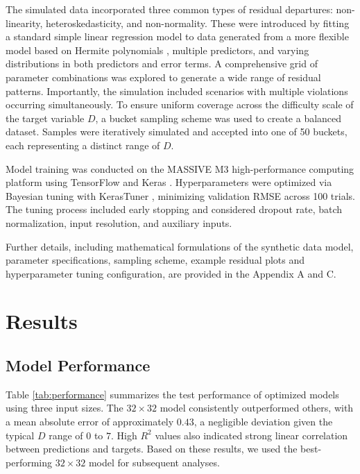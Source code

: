 \documentclass[]{interact}
\theoremstyle{plain}%
\theoremstyle{definition}
\theoremstyle{remark}
\begin{document}
The simulated data incorporated three common types of residual
departures: non-linearity, heteroskedasticity, and non-normality. These
were introduced by fitting a standard simple linear regression model to
data generated from a more flexible model based on Hermite polynomials
\citep{hermite1864nouveau}, multiple predictors, and varying
distributions in both predictors and error terms. A comprehensive grid
of parameter combinations was explored to generate a wide range of
residual patterns. Importantly, the simulation included scenarios with
multiple violations occurring simultaneously. To ensure uniform coverage
across the difficulty scale of the target variable \(D\), a bucket
sampling scheme was used to create a balanced dataset. Samples were
iteratively simulated and accepted into one of 50 buckets, each
representing a distinct range of \(D\).

Model training was conducted on the MASSIVE M3 high-performance
computing platform \citep{goscinski2014multi} using TensorFlow
\citep{abadi2016tensorflow} and Keras \citep{chollet2015keras}.
Hyperparameters were optimized via Bayesian tuning with KerasTuner
\citep{omalley2019kerastuner}, minimizing validation RMSE across 100
trials. The tuning process included early stopping and considered
dropout rate, batch normalization, input resolution, and auxiliary
inputs.

Further details, including mathematical formulations of the synthetic
data model, parameter specifications, sampling scheme, example residual
plots and hyperparameter tuning configuration, are provided in the
Appendix A and C.

\section{Results}\label{sec-model-results}

\subsection{Model Performance}\label{model-performance}

Table \ref{tab:performance} summarizes the test performance of optimized
models using three input sizes. The \(32 \times 32\) model consistently
outperformed others, with a mean absolute error of approximately
\(0.43\), a negligible deviation given the typical \(D\) range of \(0\)
to \(7\). High \(R^2\) values also indicated strong linear correlation
between predictions and targets. Based on these results, we used the
best-performing \(32 \times 32\) model for subsequent analyses.
\end{document}
